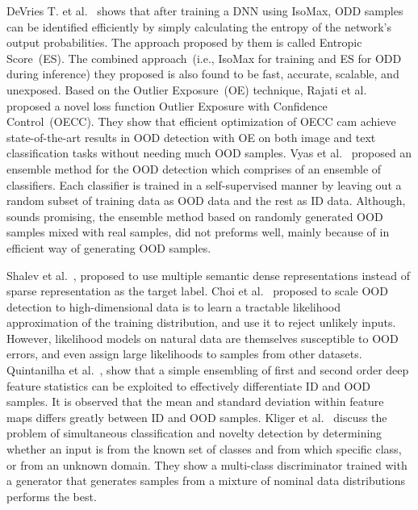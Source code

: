 \hspace*{3.5mm} DeVries T. et al.~\cite{OOD3} shows that after training a DNN using IsoMax, ODD samples can be identified efficiently by simply calculating the entropy of the network's output probabilities. The approach proposed by them is called Entropic Score~(ES). The combined approach~(i.e., IsoMax for training and ES for ODD during inference) they proposed is also found to be fast, accurate, scalable, and unexposed. Based on the Outlier Exposure~(OE) technique, Rajati et al.~\cite{OOD4} proposed a novel loss function Outlier Exposure with Confidence Control~(OECC). They show that efficient optimization of OECC cam achieve state-of-the-art results in OOD detection with OE on both image and text classification tasks without needing much OOD samples. Vyas et al.~\cite{OOD8} proposed an ensemble method for the OOD detection which comprises of an ensemble of classifiers. Each classifier is trained in a self-supervised manner by leaving out a random subset of training data as OOD data and the rest as ID data. Although, sounds promising, the ensemble method based on randomly generated OOD samples mixed with real samples, did not preforms well, mainly because of in efficient way of generating OOD samples. 

\hspace*{3.5mm} Shalev et al.~\cite{OOD10}, proposed to use multiple semantic dense representations instead of sparse representation as the target label. Choi et al.~\cite{OOD11} proposed to scale OOD detection to high-dimensional data is to learn a tractable likelihood approximation of the training distribution, and use it to reject unlikely inputs. However, likelihood models on natural data are themselves susceptible to OOD errors, and even assign large likelihoods to samples from other datasets. Quintanilha  et al.~\cite{OOD12}, show that a simple ensembling of first and second order deep feature statistics can be exploited to effectively differentiate ID and OOD samples. It is observed that the mean and standard deviation within feature maps differs greatly between ID and OOD samples. Kliger et al.~\cite{OOD15} discuss the problem of simultaneous classification and novelty detection by determining whether an input is from the known set of classes and from which specific class, or from an unknown domain. They show a multi-class discriminator trained with a generator that generates samples from a mixture of nominal data distributions performs the best.

